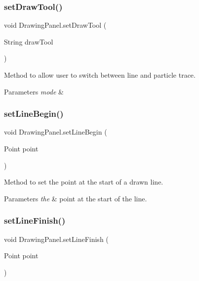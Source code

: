 \subsubsection{\texorpdfstring{set\+Draw\+Tool()}{setDrawTool()}}
{\footnotesize\ttfamily void Drawing\+Panel.\+set\+Draw\+Tool (\begin{DoxyParamCaption}\item[{String}]{draw\+Tool }\end{DoxyParamCaption})}



Method to allow user to switch between line and particle trace. 


\begin{DoxyParams}{Parameters}
{\em mode} & \\
\hline
\end{DoxyParams}
\mbox{\label{class_drawing_panel_a4efd38d997c0ddf31cc49ca18898484d}} 
\subsubsection{\texorpdfstring{set\+Line\+Begin()}{setLineBegin()}}
{\footnotesize\ttfamily void Drawing\+Panel.\+set\+Line\+Begin (\begin{DoxyParamCaption}\item[{Point}]{point }\end{DoxyParamCaption})}



Method to set the point at the start of a drawn line. 


\begin{DoxyParams}{Parameters}
{\em the} & point at the start of the line. \\
\hline
\end{DoxyParams}
\mbox{\label{class_drawing_panel_abf64c73a6dced3ea8183a2354a06cae7}} 
\subsubsection{\texorpdfstring{set\+Line\+Finish()}{setLineFinish()}}
{\footnotesize\ttfamily void Drawing\+Panel.\+set\+Line\+Finish (\begin{DoxyParamCaption}\item[{Point}]{point }\end{DoxyParamCaption})}




